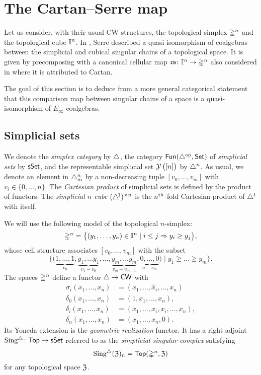 \section{The Cartan--Serre map} \label{s:comparison}

Let us consider, with their usual CW structures, the topological simplex $\mathbb{\Delta}^n$ and the topological cube $\mathbb{I}^n$.
In \cite[p. 442]{serre1951homologie}, Serre described a quasi-isomorphism of coalgebras between the simplicial and cubical singular chains of a topological space.
It is given by precomposing with a canonical cellular map $\operatorname{\mathfrak{cs}} \colon \mathbb{I}^n \to \mathbb{\Delta}^n$ also considered in \cite[p.199]{eilenberg1953acyclic} where it is attributed to Cartan.

The goal of this section is to deduce from a more general categorical statement that this comparison map between singular chains of a space is a quasi-isomorphism of $E_\infty$-coalgebras.

\subsection{Simplicial sets} \label{ss:simplicial sets}

We denote the \textit{simplex category} by $\triangle$, the category $\mathsf{Fun}(\triangle^{\mathrm{op}}, \mathsf{Set})$ of \textit{simplicial sets} by $\mathsf{sSet}$, and the representable simplicial set $\operatorname{\mathcal{Y}} \big( [n] \big)$ by $\triangle^n$.
As usual, we denote an element in $\triangle^n_m$ by a non-decreasing tuple $[v_0, \dots, v_m]$ with $v_i \in \{0, \dots, n\}$.
The \textit{Cartesian product} of simplicial sets is defined by the product of functors.
The \textit{simplicial $n$-cube} $(\triangle^{\!1})^{\times n}$ is the $n^{\mathrm{th}}$-fold Cartesian product of $\triangle^1$ with itself.

We will use the following model of the topological $n$-simplex:
\[
\mathbb{\Delta}^n = \big\{ (y_1, \dots, y_n) \in \mathbb{I}^n \mid i \leq j \Rightarrow y_i \geq y_j \big\},
\]
whose cell structure associates $[v_0, \dots, v_m]$ with the subset
\begin{equation} \label{e:cell structure of gsimplex}
	\Big\{ \big( \underbrace{1, \dots, 1}_{v_0}, \underbrace{y_1, \dots y_1}_{v_1-v_0}, \dots, \underbrace{y_m, \dots y_m}_{v_m-v_{m-1}}, \underbrace{0, \dots, 0}_{n-v_m} \big) \mid y_1 \geq \dots \geq y_m \Big\}.
\end{equation}
The spaces $\mathbb{\Delta}^n$ define a functor $\triangle \to \mathsf{CW}$ with
\begin{align*}
	\sigma_i(x_1, \dots, x_n) &= (x_1, \dots, \widehat x_i, \dots, x_n) \\
	\delta_0(x_1, \dots, x_n) &= (1, x_1, \dots, x_n), \\
	\delta_i(x_1, \dots, x_n) &= (x_1, \dots, x_i, x_i, \dots, x_n), \\
	\delta_n(x_1, \dots, x_n) &= (x_1, \dots, x_n, 0).
\end{align*}
Its Yoneda extension is the \textit{geometric realization} functor.
It has a right adjoint $\operatorname{Sing^{\triangle}} \colon \mathsf{Top} \to \mathsf{sSet}$ referred to as the \textit{simplicial singular complex} satisfying
\[
\operatorname{Sing^{\triangle}}(\mathfrak{Z})_n = \mathsf{Top}(\mathbb{\Delta}^n, \mathfrak{Z})
\]
for any topological space $\mathfrak{Z}$.

